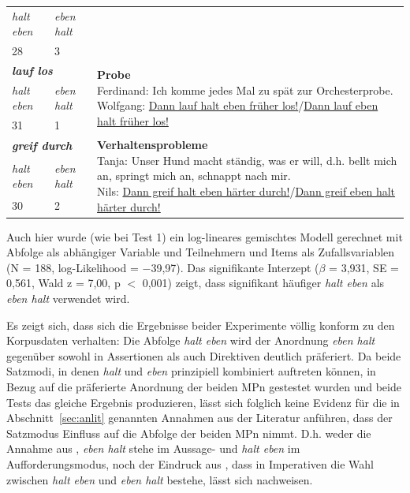 \begin{exe}
\begin{tabular}[t]{|l|l|p{30em}|}
\cline{1-2}
\emph{halt eben}& \emph{eben halt} & {}\\
\cline{1-2}
28 & 3 & {}\\
\hline
\multicolumn{2}{|l|}{\textbf{\textit{lauf los}}}& \multirow{3}{28em}{\textbf{Probe
}\newline Ferdinand: Ich komme jedes Mal zu spät zur Orchesterprobe. \newline Wolfgang: \underline{Dann lauf halt eben früher los!}/\underline{Dann lauf eben halt früher los!}}\\
\cline{1-2}
\emph{halt eben}& \emph{eben halt} & {}\\
\cline{1-2}
31 & 1 & {}\\
\hline
\multicolumn{2}{|l|}{\textbf{\textit{greif durch}}}& \multirow{3}{28em}{\textbf{Verhaltensprobleme
}\newline Tanja: Unser Hund macht ständig, was er will, d.h. bellt mich an, springt mich an, schnappt nach mir. \newline
Nils: \underline{Dann greif halt eben härter durch!}/\underline{Dann greif eben halt härter durch!}}\\
\cline{1-2}
\emph{halt eben}& \emph{eben halt} & {}\\
\cline{1-2}
30 & 2 & {}\\
\hline
\end{tabular}
\end{exe}
Auch hier wurde (wie bei Test 1) ein log-lineares gemischtes Modell gerechnet mit Abfolge als abhängiger Variable und Teilnehmern und Items als Zufallsvariablen (N = 188, log-Likelihood = $\minus$39,97). Das signifikante Interzept ($\beta$ = 3,931, SE = 0,561, Wald z = 7,00, p $<$ 0,001) zeigt, dass signifikant häufiger \textit{halt eben} als \textit{eben halt} verwendet wird.

Es zeigt sich, dass sich die Ergebnisse beider Experimente völlig konform zu den Korpusdaten verhalten: Die Abfolge \textit{halt eben} wird der Anordnung \textit{eben halt} gegenüber sowohl in Assertionen als auch Direktiven deutlich präferiert. Da beide Satzmodi, in denen \textit{halt} und \textit{eben} prinzipiell kombiniert auftreten können, in Bezug auf die präferierte Anordnung der beiden MPn gestestet wurden und beide Tests das gleiche Ergebnis produzieren, lässt sich folglich keine Evidenz für die in Abschnitt~\ref{sec:anlit} genannten Annahmen aus der Literatur anführen, dass der Satzmodus Einfluss auf die Abfolge der beiden MPn nimmt. D.h. weder die Annahme aus \citet[1542-1543]{Zifonun1997}, \textit{eben halt} stehe im Aussage- und \textit{halt eben} im Aufforderungsmodus, noch der Eindruck aus \citet[230]{Dahl1988}, dass in Imperativen die Wahl zwischen \textit{halt eben} und \textit{eben halt} bestehe, lässt sich nachweisen.

